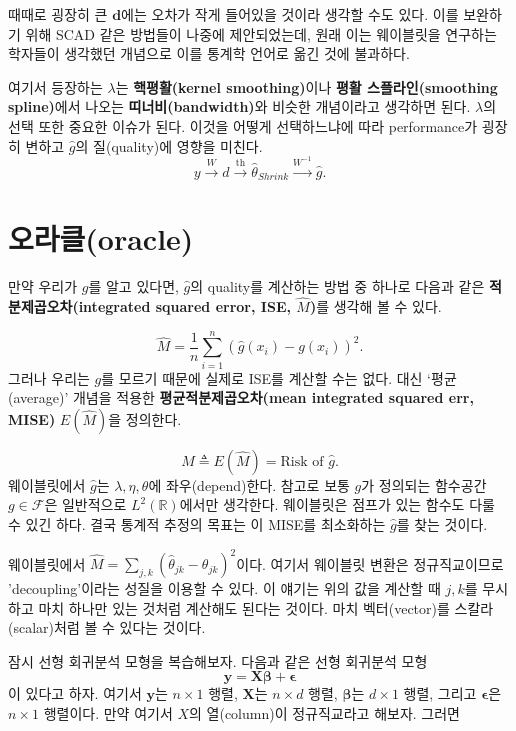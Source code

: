 \documentclass[b5paper,]{scrbook}
\theoremstyle{plain}
\theoremstyle{definition}
\numberwithin{equation}{section}
\begin{document}
때때로 굉장히 큰 \(\mathbf{d}\)에는 오차가 작게 들어있을 것이라 생각할
수도 있다. 이를 보완하기 위해 SCAD 같은 방법들이 나중에 제안되었는데,
원래 이는 웨이블릿을 연구하는 학자들이 생각했던 개념으로 이를 통계학
언어로 옮긴 것에 불과하다.

여기서 등장하는 \(\lambda\)는 \textbf{핵평활(kernel smoothing)}이나
\textbf{평활 스플라인(smoothing spline)}에서 나오는
\textbf{띠너비(bandwidth)}와 비슷한 개념이라고 생각하면 된다.
\(\lambda\)의 선택 또한 중요한 이슈가 된다. 이것을 어떻게 선택하느냐에
따라 performance가 굉장히 변하고 \(\hat{g}\)의 질(quality)에 영향을
미친다.
\[y \xrightarrow{W} d \xrightarrow{\text{th}} \hat{\theta}_{Shrink} \xrightarrow{W^{-1}} \hat{g}.\]

\section{오라클(oracle)}\label{oracle}

만약 우리가 \(g\)를 알고 있다면, \(\hat{g}\)의 quality를 계산하는 방법
중 하나로 다음과 같은 \textbf{적분제곱오차(integrated squared error,
ISE, \(\hat{M}\))}를 생각해 볼 수 있다.

\[\hat{M}=\frac{1}{n}\sum_{i=1}^{n}(\hat{g}(x_{i})-g(x_{i}))^{2}.\]
그러나 우리는 \(g\)를 모르기 때문에 실제로 ISE를 계산할 수는 없다. 대신
`평균(average)' 개념을 적용한 \textbf{평균적분제곱오차(mean integrated
squared err, MISE)} \(E(\hat{M})\)을 정의한다.

\[ M \triangleq E(\hat{M})=\text{Risk of }\hat{g}.\] 웨이블릿에서
\(\hat{g}\)는 \(\lambda, \eta, \theta\)에 좌우(depend)한다. 참고로 보통
\(g\)가 정의되는 함수공간 \(g \in \mathcal{F}\)은 일반적으로
\(L^{2}(\mathbb{R})\)에서만 생각한다. 웨이블릿은 점프가 있는 함수도 다룰
수 있긴 하다. 결국 통계적 추정의 목표는 이 MISE를 최소화하는
\(\hat{g}\)를 찾는 것이다.

웨이블릿에서
\(\hat{M}=\sum_{j,k}(\hat{\theta}_{jk}-\theta_{jk})^{2}\)이다. 여기서
웨이블릿 변환은 정규직교이므로 'decoupling'이라는 성질을 이용할 수 있다.
이 얘기는 위의 값을 계산할 때 \(j,k\)를 무시하고 마치 하나만 있는 것처럼
계산해도 된다는 것이다. 마치 벡터(vector)를 스칼라(scalar)처럼 볼 수
있다는 것이다.

잠시 선형 회귀분석 모형을 복습해보자. 다음과 같은 선형 회귀분석 모형
\[\mathbf{y}=\mathbf{X}\boldsymbol{\beta}+\boldsymbol{\epsilon}\] 이
있다고 하자. 여기서 \(\mathbf{y}\)는 \(n \times 1\) 행렬,
\(\mathbf{X}\)는 \(n \times d\) 행렬, \(\boldsymbol{\beta}\)는
\(d \times 1\) 행렬, 그리고 \(\boldsymbol{\epsilon}\)은 \(n \times 1\)
행렬이다. 만약 여기서 \(X\)의 열(column)이 정규직교라고 해보자. 그러면
\end{document}
